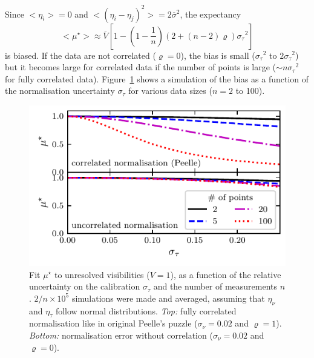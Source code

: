 \documentclass[twocolumn]{article}
\def\expect#1{\ensuremath{ {<#1>} }}
\def\ppp#1{#1^\star}
\def\norm{_\tau}
\def\meas{_\nu}
\def\mean#1{\overline{#1}}
\def\data{\ensuremath{{\scriptstyle V}}}
\def\datamean{\ensuremath{\mean\data}}
\def\mod{\ensuremath{\mu}}
\def\error{\ensuremath{\eta}}
\def\relerror{\ensuremath{\error\norm}}
\def\abserror{\ensuremath{\error\meas}}
\def\dev{\ensuremath{\sigma}}
\def\devmean{\ensuremath{\mean\dev}}
\def\reldev{\ensuremath{\dev\norm}}
\def\absdev{\ensuremath{\dev\meas}}
\def\corr{\ensuremath{\varrho}}
\def\datappp{\ppp{\mod}}
\begin{document}
Since $\expect{\error_i} = 0$ and $\expect{(\error_i-\error_j)^2} = 2\devmean^2$, the expectancy
\begin{equation}
    \expect{\ppp{\mod}} \approx \datamean 
            \left[ 1 -  
             \left(1-\frac1n\right)
             \left(2 + (n-2)\corr\right)
              \reldev^2 \right]
\end{equation}
is biased.  If the data are not correlated ($\corr = 0$), the bias is small
($\reldev^2$ to $2\reldev^2$) but it becomes large for correlated data if the number of points is large ($\sim n\reldev^2$ for fully correlated data).
Figure~\ref{fig:uncorr-peelle} shows a simulation of the bias as a function of
the normalisation uncertainty $\reldev$ for various data sizes ($n = 2$ to
100). 
\begin{figure}
\centering
\includegraphics[width=\linewidth]{pdf/uncorrelated-peelle.pdf}
\caption{Fit $\datappp$  to unresolved visibilities ($\data = 1$), as a function of the relative uncertainty on the calibration $\reldev$ and the number of measurements $n$. $2/n\times10^5$ simulations were made and averaged, assuming that $\abserror$ and $\relerror$ follow normal distributions. \textit{Top:} fully correlated normalisation like in original Peelle's puzzle ($\absdev=0.02$ and $\corr = 1$). \textit{Bottom:} normalisation error without correlation ($\absdev=0.02$ and $\corr = 0$).}
\label{fig:uncorr-peelle}
\end{figure}
\end{document}
